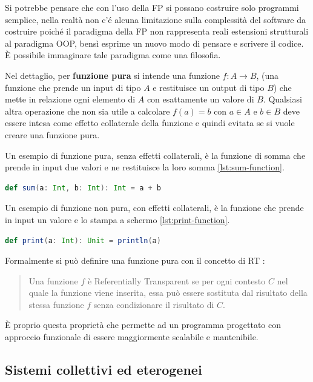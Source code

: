 \documentclass[12pt,a4paper,openright,twoside]{book}
\begin{document}
Si potrebbe pensare che con l'uso della \ac{FP} si possano costruire solo programmi semplice, nella realtà non c'é alcuna limitazione sulla complessità del software da costruire poiché il paradigma della \ac{FP} non rappresenta reali estensioni strutturali al paradigma \ac{OOP}, bensì esprime un nuovo modo di pensare e scrivere il codice. È possibile immaginare tale paradigma come una filosofia.

\label{sec:fp}
Nel dettaglio, per \textbf{funzione pura} si intende una funzione $f:A\to B$, (una funzione che prende un input di tipo $A$ e restituisce un output di tipo $B$) che mette in relazione ogni elemento di $A$ con esattamente un valore di $B$. Qualsiasi altra operazione che non sia utile a calcolare $f(a)=b$ con $a\in A$ e $b\in B$ deve essere intesa come effetto collaterale della funzione e quindi evitata se si vuole creare una funzione pura.

Un esempio di funzione pura, senza effetti collaterali, è la funzione di somma che prende in input due valori e ne restituisce la loro somma \cref{lst:sum-function}. 

\begin{lstlisting}[language=Scala, label={lst:sum-function}, caption={Esempio di funzione pura in Scala}]
    def sum(a: Int, b: Int): Int = a + b
\end{lstlisting}

Un esempio di funzione non pura, con effetti collaterali, è la funzione che prende in input un valore e lo stampa a schermo \cref{lst:print-function}.

\begin{lstlisting}[language=Scala, label={lst:print-function}, caption={Esempio di funzione non pura in Scala}]
    def print(a: Int): Unit = println(a)
\end{lstlisting}

Formalmente si può definire una funzione pura con il concetto di \ac{RT} \cite{Hunt2018}:

\begin{quote}
    Una funzione $f$ è Referentially Transparent se per ogni contesto $C$ nel quale la funzione viene inserita, essa può essere sostituta dal risultato della stessa funzione $f$ senza condizionare il risultato di $C$.
\end{quote}

È proprio questa proprietà che permette ad un programma progettato con approccio funzionale di essere maggiormente scalabile e mantenibile.

\subsection{Sistemi collettivi ed eterogenei} 
\end{document}
